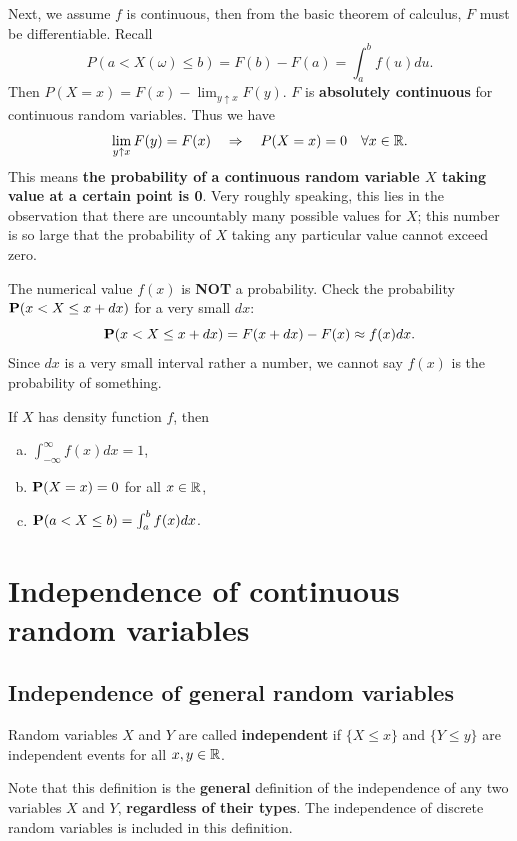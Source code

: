 Next, we assume $f$ is continuous, then from the basic theorem of calculus, $F$ must be differentiable. Recall 
\begin{equation*}
    P(a < X(\omega) \leq b) = F(b) - F(a) = \int_{a}^b f(u)du.
\end{equation*}
Then $P(X=x) = F(x) - \lim_{y \uparrow x} F(y)$. $F$ is \textbf{absolutely continuous} for continuous random variables. Thus we have
\begin{equation*}
    \lim_{y\uparrow x} F(y) = F(x) \quad \Rightarrow \quad P(X=x) = 0 \quad \forall x\in\mathbb{R}.
\end{equation*}
This means \textbf{the probability of a continuous random variable $X$ taking value at a certain point is 0}. Very roughly speaking, this lies in the observation that there are uncountably many possible values for $X$; this number is so large that the probability of $X$ taking any particular value cannot exceed zero. 

The numerical value $f(x)$ is \textbf{NOT} a probability. Check the probability $\mathbf{P}(x < X \leq x + dx)$ for a very small $dx$:
\begin{equation*}
    \mathbf{P}(x < X \leq x + dx) = F(x + dx) - F(x) \approx f(x) dx. 
\end{equation*}
Since $dx$ is a very small interval rather a number, we cannot say $f(x)$ is the probability of something.

\begin{lemma}
If $X$ has density function $f$, then
\begin{enumerate}[(a)]
    \item $\int_{-\infty}^\infty f(x)dx = 1$,
    \item $\mathbf{P}(X=x) = 0$ for all $x \in \mathbb{R}$,
    \item $\mathbf{P}(a < X \leq b) = \int_a^b f(x)dx$.
\end{enumerate}
\end{lemma}

\section{Independence of continuous random variables}
\subsection{Independence of general random variables}
\begin{definition}
Random variables $X$ and $Y$ are called \textbf{independent} if $\{ X \leq x\}$ and $\{Y \leq y\}$ are independent events for all $x, y \in \mathbb{R}$. 
\end{definition}
Note that this definition is the \textbf{general} definition of the independence of any two variables $X$ and $Y$, \textbf{regardless of their types}. The independence of discrete random variables is included in this definition. 

